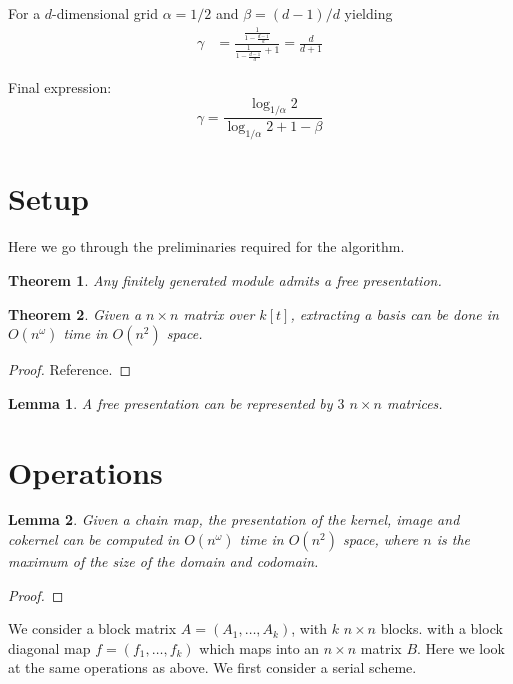\documentclass{amsart}
\newtheorem{theorem}{Theorem}[section]
\newtheorem{lemma}{Lemma}[theorem]
\begin{document}
For a $d$-dimensional grid  $\alpha=1/2$ and $\beta =(d-1)/d$
yielding
\begin{align*}
	\gamma &= \frac{\frac{1}{1-\frac{d-1}{d}}}{\frac{1}{1-\frac{d-1}{d}}+1} = \frac{d}{d+1}
\end{align*}

Final expression:
$$ \gamma = \frac{\log_{1/\alpha} 2}{\log_{1/\alpha} 2 + 1 -\beta}$$
\section{Setup}
Here we go through the preliminaries required for the algorithm.
\begin{theorem}
	Any finitely generated module admits a free presentation.
\end{theorem}

\begin{theorem}
	Given a $n\times n$ matrix over $k[t]$, extracting a basis can be done in $O(n^\omega)$ time in $O(n^2)$ space.
\end{theorem}
\begin{proof}
	Reference.
\end{proof}

\begin{lemma}
	A free presentation can be represented by $3$ $n \times n$ matrices.
\end{lemma}



\section{Operations}
\begin{lemma}
	Given a chain map, the presentation of the  kernel, image and cokernel can be computed in $O(n^\omega)$ time in $O(n^2)$ space, where $n$ is the maximum of the size of the domain and codomain.  
\end{lemma}
\begin{proof}
\end{proof}

We consider a block matrix $A = (A_1,\ldots,A_k)$, with $k$ $n\times n$ blocks. with a block diagonal map $f = (f_1,\ldots, f_k)$ which maps into an $n\times n$ matrix $B$.  Here we look at the same operations as above.  We first consider a serial scheme. 
\end{document}
